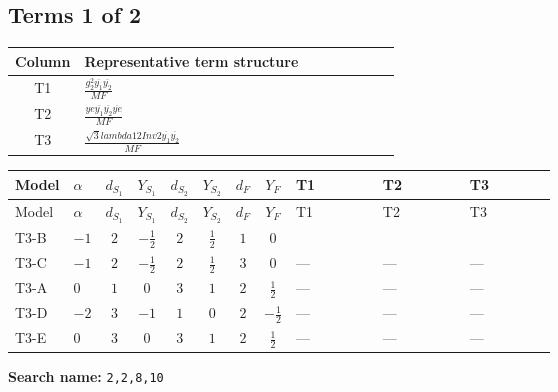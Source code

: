 \documentclass[8pt]{article}
\begin{document}
\begin{landscape}
\subsection*{Terms 1 of 2}
\begin{center}
\begin{tabular}{@{}c >{\raggedright\arraybackslash}p{0.82\linewidth}@{}}
\toprule
Column & Representative term structure \\
\midrule
T1 & \(\displaystyle \frac{g_{2}^{2} \overline{y_{1}} \overline{y_{2}}}{MF}\) \\
\midrule
T2 & \(\displaystyle \frac{ye \overline{y_{1}} \overline{y_{2}} \overline{ye}}{MF}\) \\
\midrule
T3 & \(\displaystyle \frac{\sqrt{3} lambda12Inv2 \overline{y_{1}} \overline{y_{2}}}{MF}\) \\
\midrule
\bottomrule
\end{tabular}
\end{center}
\smallskip
\tiny
\begin{longtable}{@{}llcccccc >{\raggedright\arraybackslash}p{0.21\linewidth} >{\raggedright\arraybackslash}p{0.21\linewidth} >{\raggedright\arraybackslash}p{0.21\linewidth}@{}}
\toprule
Model & $\alpha$ & $d_{S_1}$ & $Y_{S_1}$ & $d_{S_2}$ & $Y_{S_2}$ & $d_F$ & $Y_F$ & T1 & T2 & T3 \\
\midrule
\endfirsthead
\toprule
Model & $\alpha$ & $d_{S_1}$ & $Y_{S_1}$ & $d_{S_2}$ & $Y_{S_2}$ & $d_F$ & $Y_F$ & T1 & T2 & T3 \\
\midrule
\endhead
T3-B & $-1$ & $2$ & $-\frac{1}{2}$ & $2$ & $\frac{1}{2}$ & $1$ & $0$ & \scriptsize\adjustbox{max width=\linewidth}{$\begin{gathered} \frac{3 g_{2}^{2} \overline{y_{1}} \overline{y_{2}}}{4 MF}\end{gathered}$} & \scriptsize\adjustbox{max width=\linewidth}{$\begin{gathered} - \frac{ye \overline{y_{1}} \overline{y_{2}} \overline{ye}}{4 MF}\end{gathered}$} & \scriptsize\adjustbox{max width=\linewidth}{$\begin{gathered} \frac{\sqrt{3} lambda12Inv2 \overline{y_{1}} \overline{y_{2}}}{3 MF}\end{gathered}$} \\
\midrule
T3-C & $-1$ & $2$ & $-\frac{1}{2}$ & $2$ & $\frac{1}{2}$ & $3$ & $0$ & --- & --- & --- \\
\midrule
T3-A & $0$ & $1$ & $0$ & $3$ & $1$ & $2$ & $\frac{1}{2}$ & --- & --- & --- \\
\midrule
T3-D & $-2$ & $3$ & $-1$ & $1$ & $0$ & $2$ & $-\frac{1}{2}$ & --- & --- & --- \\
\midrule
T3-E & $0$ & $3$ & $0$ & $3$ & $1$ & $2$ & $\frac{1}{2}$ & --- & --- & --- \\
\midrule
\bottomrule
\end{longtable}
\clearpage
\noindent\textbf{Search name: }\texttt{2,2,8,10}\par\smallskip

\end{landscape}
\end{document}
